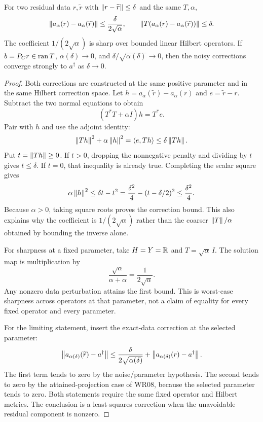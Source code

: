\begin{theorem}\label{WR09}
For two residual data $r,\widetilde r$ with $\left\lVert r-\widetilde r\right\rVert\le\delta$ and the same $T,\alpha$,
\[
 \left\lVert a_\alpha(r)-a_\alpha(\widetilde r)\right\rVert
 \le\frac{\delta}{2\sqrt\alpha},\qquad
 \left\lVert T(a_\alpha(r)-a_\alpha(\widetilde r))\right\rVert\le\delta.
\]
The coefficient $1/(2\sqrt\alpha)$ is sharp over bounded linear Hilbert operators. If $b=P_Cr\in\operatorname{ran} T$, $\alpha(\delta)\to0$, and $\delta/\sqrt{\alpha(\delta)}\to0$, then the noisy corrections converge strongly to $a^\dagger$ as $\delta\to0$.
\end{theorem}
\begin{proof}
Both corrections are constructed at the same positive parameter and in the same Hilbert correction space. Let $h=a_\alpha(\widetilde r)-a_\alpha(r)$ and $e=\widetilde r-r$. Subtract the two normal equations to obtain
\[
 (T^*T+\alpha I)h=T^*e.
\]
Pair with $h$ and use the adjoint identity:
\[
 \left\lVert Th\right\rVert^2+\alpha\left\lVert h\right\rVert^2
 =\langle e,Th\rangle\le\delta\left\lVert Th\right\rVert.
\]
Put $t=\left\lVert Th\right\rVert\ge0$. If $t>0$, dropping the nonnegative penalty and dividing by $t$ gives $t\le\delta$. If $t=0$, that inequality is already true. Completing the scalar square gives
\[
 \alpha\left\lVert h\right\rVert^2\le\delta t-t^2
 =\frac{\delta^2}{4}-(t-\delta/2)^2
 \le\frac{\delta^2}{4}.
\]
Because $\alpha>0$, taking square roots proves the correction bound. This also explains why the coefficient is $1/(2\sqrt\alpha)$ rather than the coarser $\left\lVert T\right\rVert/\alpha$ obtained by bounding the inverse alone.

For sharpness at a fixed parameter, take $H=Y=\mathbb R$ and $T=\sqrt\alpha\,I$. The solution map is multiplication by
\[
 \frac{\sqrt\alpha}{\alpha+\alpha}=\frac1{2\sqrt\alpha}.
\]
Any nonzero data perturbation attains the first bound. This is worst-case sharpness across operators at that parameter, not a claim of equality for every fixed operator and every parameter.

For the limiting statement, insert the exact-data correction at the selected parameter:
\[
 \left\lVert a_{\alpha(\delta)}(\widetilde r)-a^\dagger\right\rVert
 \le\frac{\delta}{2\sqrt{\alpha(\delta)}}
       +\left\lVert a_{\alpha(\delta)}(r)-a^\dagger\right\rVert.
\]
The first term tends to zero by the noise/parameter hypothesis. The second tends to zero by the attained-projection case of WR08, because the selected parameter tends to zero. Both statements require the same fixed operator and Hilbert metrics. The conclusion is a least-squares correction when the unavoidable residual component is nonzero.
\end{proof}

